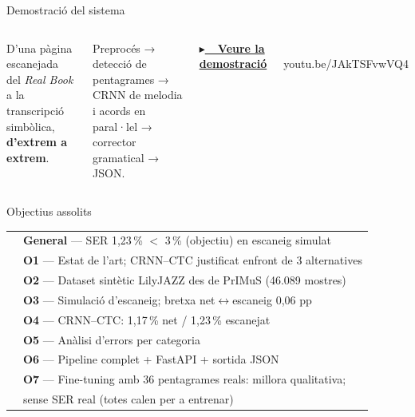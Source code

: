 \documentclass[aspectratio=169,10pt]{beamer}
\newcommand{\ok}{\textcolor{accent}{\ding{52}}}        %
\newcommand{\halfok}{\textcolor{highlight}{\LEFTcircle}}%
\begin{document}
\begin{frame}{Demostració del sistema}
  \vspace{0.4em}
  \begin{columns}[c]
    {\large D'una pàgina escanejada del \textit{Real Book} a la transcripció simbòlica, \textbf{d'extrem a extrem}.}
    \vspace{1.1em}

    {\small\color{muted} Preprocés → detecció de pentagrames → CRNN de melodia i acords en paral·lel → corrector gramatical → JSON.}
    \vspace{1.4em}

    {\setlength{\fboxsep}{9pt}%
     \href{https://youtu.be/JAkTSFvwVQ4}{%
       \colorbox{accent}{\color{white}\textbf{$\blacktriangleright$\ \ Veure la demostració}}}}

    \centering
    \\[0.5em]
    {\footnotesize\color{muted} youtu.be/JAkTSFvwVQ4}
  \end{columns}
\end{frame}

\begin{frame}{Objectius assolits}
  \vspace{0.3em}
  {\renewcommand{\arraystretch}{1.45}
  \begin{tabular}{@{}c l@{}}
    \ok & \textbf{General} — SER 1,23\,\% $<$ 3\,\% (objectiu) en escaneig simulat \\
    \ok & \textbf{O1} — Estat de l'art; CRNN--CTC justificat enfront de 3 alternatives \\
    \ok & \textbf{O2} — Dataset sintètic LilyJAZZ des de PrIMuS (46.089 mostres) \\
    \ok & \textbf{O3} — Simulació d'escaneig; bretxa net$\leftrightarrow$escaneig 0,06 pp \\
    \ok & \textbf{O4} — CRNN--CTC: 1,17\,\% net / 1,23\,\% escanejat \\
    \ok & \textbf{O5} — Anàlisi d'errors per categoria \\
    \ok & \textbf{O6} — Pipeline complet + FastAPI + sortida JSON \\
    \halfok & \textbf{O7} — Fine-tuning amb 36 pentagrames reals: millora qualitativa; \\
            & \phantom{\textbf{O7} —} sense SER real (totes calen per a entrenar) \\
  \end{tabular}}
\end{frame}
\end{document}
